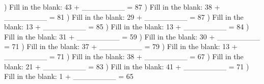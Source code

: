 \documentclass{article}%
\begin{document}
) Fill in the blank: 43 + \_\_\_\_\_\_\_\_ = 87%
\newline%
\newline%
) Fill in the blank: 38 + \_\_\_\_\_\_\_\_ = 81%
\newline%
\newline%
) Fill in the blank: 29 + \_\_\_\_\_\_\_\_ = 87%
\newline%
\newline%
) Fill in the blank: 13 + \_\_\_\_\_\_\_\_ = 85%
\newline%
\newline%
) Fill in the blank: 13 + \_\_\_\_\_\_\_\_ = 84%
\newline%
\newline%
) Fill in the blank: 31 + \_\_\_\_\_\_\_\_ = 59%
\newline%
\newline%
) Fill in the blank: 30 + \_\_\_\_\_\_\_\_ = 71%
\newline%
\newline%
) Fill in the blank: 37 + \_\_\_\_\_\_\_\_ = 79%
\newline%
\newline%
) Fill in the blank: 13 + \_\_\_\_\_\_\_\_ = 71%
\newline%
\newline%
) Fill in the blank: 38 + \_\_\_\_\_\_\_\_ = 67%
\newline%
\newline%
) Fill in the blank: 21 + \_\_\_\_\_\_\_\_ = 83%
\newline%
\newline%
) Fill in the blank: 41 + \_\_\_\_\_\_\_\_ = 71%
\newline%
\newline%
) Fill in the blank: 1 + \_\_\_\_\_\_\_\_ = 65%
\newline%
\newline%
\end{document}
